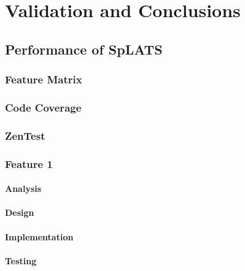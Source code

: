 \chapter{Validation and Conclusions}
\section{Performance of SpLATS}
  \subsection{Feature Matrix}
  \subsection{Code Coverage}
  \subsection{ZenTest}
  \subsection{Feature 1}
    \subsubsection{Analysis}
    \subsubsection{Design}
    \subsubsection{Implementation}
    \subsubsection{Testing}
